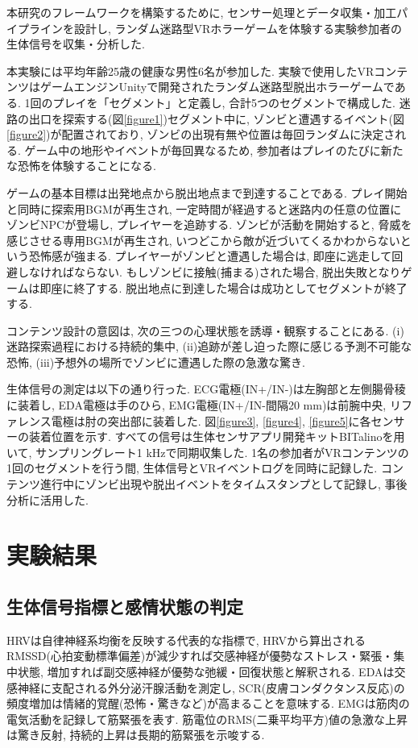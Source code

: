 \documentclass[a4paper]{jarticle}
\begin{document}
本研究のフレームワークを構築するために, センサー処理とデータ収集・加工パイプラインを設計し, ランダム迷路型VRホラーゲームを体験する実験参加者の生体信号を収集・分析した. 

本実験には平均年齢25歳の健康な男性6名が参加した.
実験で使用したVRコンテンツはゲームエンジンUnityで開発されたランダム迷路型脱出ホラーゲームである. 1回のプレイを「セグメント」と定義し, 合計5つのセグメントで構成した. 迷路の出口を探索する(図\ref{figure1})セグメント中に, ゾンビと遭遇するイベント(図\ref{figure2})が配置されており, ゾンビの出現有無や位置は毎回ランダムに決定される. ゲーム中の地形やイベントが毎回異なるため, 参加者はプレイのたびに新たな恐怖を体験することになる.

ゲームの基本目標は出発地点から脱出地点まで到達することである. プレイ開始と同時に探索用BGMが再生され, 一定時間が経過すると迷路内の任意の位置にゾンビNPCが登場し, プレイヤーを追跡する. ゾンビが活動を開始すると, 脅威を感じさせる専用BGMが再生され, いつどこから敵が近づいてくるかわからないという恐怖感が強まる. プレイヤーがゾンビと遭遇した場合は, 即座に逃走して回避しなければならない. もしゾンビに接触(捕まる)された場合, 脱出失敗となりゲームは即座に終了する. 脱出地点に到達した場合は成功としてセグメントが終了する.

コンテンツ設計の意図は, 次の三つの心理状態を誘導・観察することにある. (i)迷路探索過程における持続的集中, (ii)追跡が差し迫った際に感じる予測不可能な恐怖, (iii)予想外の場所でゾンビに遭遇した際の急激な驚き. 

生体信号の測定は以下の通り行った. ECG電極({IN+}/{IN-})は左胸部と左側腸骨稜に装着し, EDA電極は手のひら, EMG電極({IN+}/{IN-}間隔20 mm)は前腕中央, リファレンス電極は肘の突出部に装着した. 図\ref{figure3}, \ref{figure4}, \ref{figure5}に各センサーの装着位置を示す. すべての信号は生体センサアプリ開発キットBITalinoを用いて, サンプリングレート1 kHzで同期収集した.
1名の参加者がVRコンテンツの1回のセグメントを行う間, 生体信号とVRイベントログを同時に記録した. コンテンツ進行中にゾンビ出現や脱出イベントをタイムスタンプとして記録し, 事後分析に活用した.

\section{実験結果}%

\subsection{生体信号指標と感情状態の判定}

HRVは自律神経系均衡を反映する代表的な指標で, HRVから算出されるRMSSD(心拍変動標準偏差)が減少すれば交感神経が優勢なストレス・緊張・集中状態, 増加すれば副交感神経が優勢な弛緩・回復状態と解釈される\cite{bib06,bib07}. EDAは交感神経に支配される外分泌汗腺活動を測定し, SCR(皮膚コンダクタンス反応)の頻度増加は情緒的覚醒(恐怖・驚きなど)が高まることを意味する\cite{bib08,bib09}. EMGは筋肉の電気活動を記録して筋緊張を表す. 筋電位のRMS(二乗平均平方)値の急激な上昇は驚き反射, 持続的上昇は長期的筋緊張を示唆する\cite{bib10,bib11}.
\end{document}
